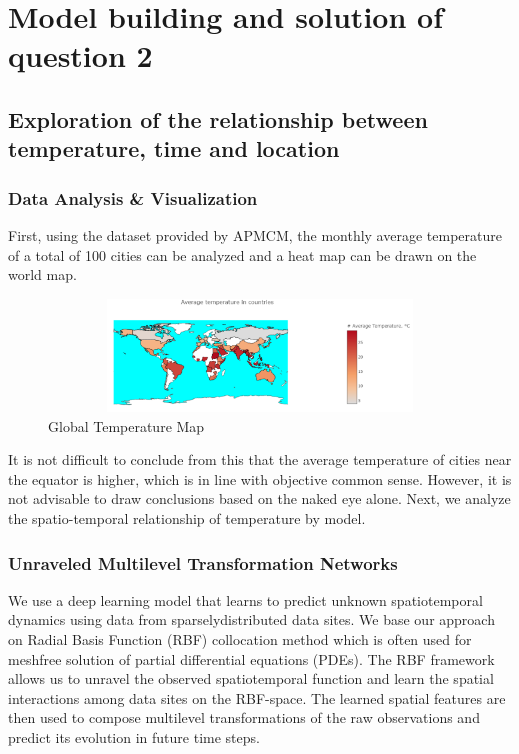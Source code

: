 \documentclass{apmcmthesis}
\begin{document}
\section{Model building and solution of question 2}
\subsection{Exploration of the relationship between temperature, time and location}
\subsubsection{Data Analysis \& Visualization}
First, using the dataset provided by APMCM, the monthly average temperature of a total of 100 cities can be analyzed and a heat map can be drawn on the world map\cite{hot}.
\begin{figure}[!h]
    \centering
    \includegraphics[width=13cm,height=3cm]{APMCMThesis/figures/hot.png}
    \caption{Global Temperature Map}
    \label{hot}
\end{figure}

It is not difficult to conclude from this that the average temperature of cities near the equator is higher, which is in line with objective common sense. However, it is not advisable to draw conclusions based on the naked eye alone. Next, we analyze the spatio-temporal relationship of temperature by model.
\subsubsection{Unraveled Multilevel Transformation Networks}
We use a deep learning model\cite{4} that learns to predict unknown
spatiotemporal dynamics using data from sparselydistributed data sites. We base our approach on Radial
Basis Function (RBF) collocation method which is
often used for meshfree solution of partial differential
equations (PDEs). The RBF framework allows us to
unravel the observed spatiotemporal function and
learn the spatial interactions among data sites on the
RBF-space. The learned spatial features are then used
to compose multilevel transformations of the raw
observations and predict its evolution in future time
steps. 
\end{document}

